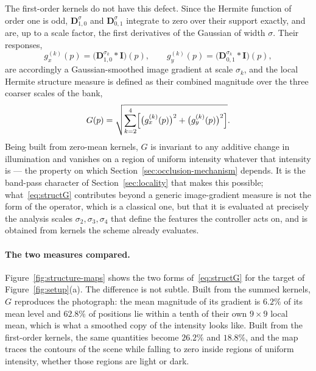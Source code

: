 The first-order kernels do not have this defect. Since the Hermite function of
order one is odd, $\mathbf{D}_{1,0}^{\sigma}$ and $\mathbf{D}_{0,1}^{\sigma}$
integrate to zero over their support exactly, and are, up to a scale factor,
the first derivatives of the Gaussian of width $\sigma$. Their responses,
\begin{equation}
    g_{x}^{(k)}(p)=\bigl(\mathbf{D}_{1,0}^{\sigma_{k}}\ast\mathbf{I}\bigr)(p),
    \qquad
    g_{y}^{(k)}(p)=\bigl(\mathbf{D}_{0,1}^{\sigma_{k}}\ast\mathbf{I}\bigr)(p),
    \label{eq:first-order-responses}
\end{equation}
are accordingly a Gaussian-smoothed image gradient at scale $\sigma_{k}$, and
the local Hermite structure measure is defined as their combined magnitude
over the three coarser scales of the bank,
\begin{equation}
    G(p)=\sqrt{\sum_{k=2}^{4}\Bigl[\bigl(g_{x}^{(k)}(p)\bigr)^{2}
                                  +\bigl(g_{y}^{(k)}(p)\bigr)^{2}\Bigr]}.
    \label{eq:structG}
\end{equation}
Being built from zero-mean kernels, $G$ is invariant to any additive change in
illumination and vanishes on a region of uniform intensity whatever that
intensity is --- the property on which Section~\ref{sec:occlusion-mechanism}
depends. It is the band-pass character of Section~\ref{sec:locality} that
makes this possible; what~\eqref{eq:structG} contributes beyond a generic
image-gradient measure is not the form of the operator, which is a classical
one, but that it is evaluated at precisely the analysis scales
$\sigma_{2},\sigma_{3},\sigma_{4}$ that define the features the controller
acts on, and is obtained from kernels the scheme already evaluates.

\paragraph{The two measures compared.}
Figure~\ref{fig:structure-maps} shows the two forms of~\eqref{eq:structG} for
the target of Figure~\ref{fig:setup}(a). The difference is not subtle. Built
from the summed kernels, $G$ reproduces the photograph: the mean magnitude of
its gradient is $6.2\%$ of its mean level and $62.8\%$ of positions lie within
a tenth of their own $9\times9$ local mean, which is what a smoothed copy of
the intensity looks like. Built from the first-order kernels, the same
quantities become $26.2\%$ and $18.8\%$, and the map traces the contours of
the scene while falling to zero inside regions of uniform intensity, whether
those regions are light or dark.

